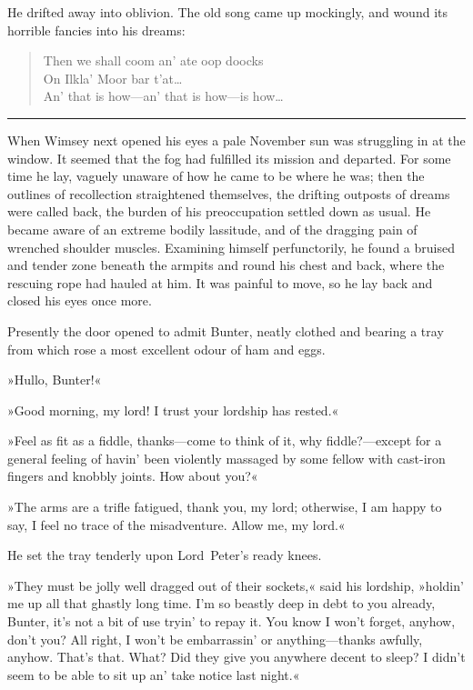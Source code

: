 He drifted away into oblivion. The old song came up mockingly, and wound its horrible fancies into his dreams: 

\begin{verse}
\begin{altverse}
Then we shall coom an' ate oop doocks\\
On Ilkla' Moor bar t'at\dots\\
An' that is how—{\small an' that is how—}{\footnotesize is how\dots}\\
\end{altverse}
\end{verse}

\noindent\hfil\rule{0.5\textwidth}{.4pt}\hfil 

When Wimsey next opened his eyes a pale November sun was struggling in at the window. It seemed that the fog had fulfilled its mission and departed. For some time he lay, vaguely unaware of how he came to be where he was; then the outlines of recollection straightened themselves, the drifting outposts of dreams were called back, the burden of his preoccupation settled down as usual. He became aware of an extreme bodily lassitude, and of the dragging pain of wrenched shoulder muscles. Examining himself perfunctorily, he found a bruised and tender zone beneath the armpits and round his chest and back, where the rescuing rope had hauled at him. It was painful to move, so he lay back and closed his eyes once more.

Presently the door opened to admit Bunter, neatly clothed and bearing a tray from which rose a most excellent odour of ham and eggs.

»Hullo, Bunter!«

»Good morning, my lord! I trust your lordship has rested.«

»Feel as fit as a fiddle, thanks—come to think of it, why fiddle?—except for a general feeling of havin' been violently massaged by some fellow with cast-iron fingers and knobbly joints. How about you?«

»The arms are a trifle fatigued, thank you, my lord; otherwise, I am happy to say, I feel no trace of the misadventure. Allow me, my lord.«

He set the tray tenderly upon Lord~Peter's ready knees.

»They must be jolly well dragged out of their sockets,« said his lordship, »holdin' me up all that ghastly long time. I'm so beastly deep in debt to you already, Bunter, it's not a bit of use tryin' to repay it. You know I won't forget, anyhow, don't you? All right, I won't be embarrassin' or anything—thanks awfully, anyhow. That's that.  What? Did they give you anywhere decent to sleep? I didn't seem to be able to sit up an' take notice last night.«

